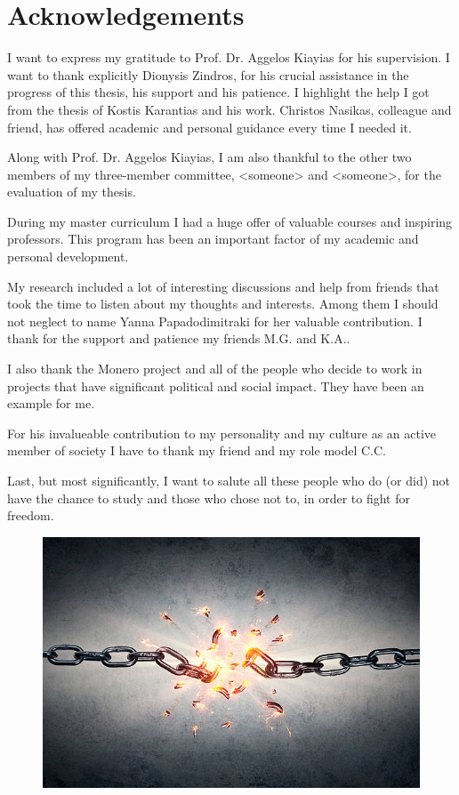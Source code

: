 \chapter*{Acknowledgements}
I want to express my gratitude to Prof. Dr. Aggelos Kiayias for his supervision. I want to thank explicitly Dionysis Zindros, for his crucial assistance in the progress of this thesis, his support and his patience. I highlight the help I got from the thesis of Kostis Karantias and his work. Christos Nasikas, colleague and friend, has offered academic and personal guidance every time I needed it.

Along with Prof. Dr. Aggelos Kiayias, I am also thankful to the other two members of my three-member committee, <someone> and <someone>, for the evaluation of my thesis.

During my master curriculum I had a huge offer of valuable courses and inspiring professors. This program has been an important factor of my academic and personal development.

My research included a lot of interesting discussions and help from friends that took the time to listen about my thoughts and interests. Among them I should not neglect to name Yanna Papadodimitraki for her valuable contribution. I thank for the support and patience my friends M.G. and K.A..

I also thank the Monero project and all of the people who decide to work in projects that have significant political and social impact. They have been an example for me.

For his invalueable contribution to my personality and my culture as an active member of society I have to thank my friend and my role model C.C.

Last, but most significantly, I want to salute all these people who do (or did) not have the chance to study and those who chose not to, in order to fight for freedom.
\begin{figure}[H]
  \centering
  \includegraphics[scale=0.30,keepaspectratio]{Images/Acknowledgements/broken-chain.jpg}
\end{figure}
%
